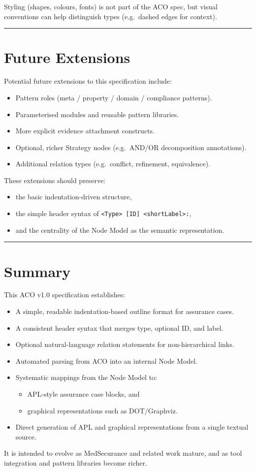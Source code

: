\documentclass[11pt]{article}
\begin{document}
Styling (shapes, colours, fonts) is not part of the ACO spec, but visual conventions can help distinguish types (e.g.\ dashed edges for context).

\bigskip
\hrule
\bigskip

\section{Future Extensions}

Potential future extensions to this specification include:

\begin{itemize}[leftmargin=2em]
  \item Pattern roles (meta / property / domain / compliance patterns).
  \item Parameterised modules and reusable pattern libraries.
  \item More explicit evidence attachment constructs.
  \item Optional, richer Strategy nodes (e.g.\ AND/OR decomposition annotations).
  \item Additional relation types (e.g.\ conflict, refinement, equivalence).
\end{itemize}

These extensions should preserve:
\begin{itemize}[leftmargin=2em]
  \item the basic indentation-driven structure,
  \item the simple header syntax of \texttt{\textless Type\textgreater{} [ID] \textless shortLabel\textgreater:},
  \item and the centrality of the Node Model as the semantic representation.
\end{itemize}

\bigskip
\hrule
\bigskip

\section{Summary}

This ACO v1.0 specification establishes:

\begin{itemize}[leftmargin=2em]
  \item A simple, readable indentation-based outline format for assurance cases.
  \item A consistent header syntax that merges type, optional ID, and label.
  \item Optional natural-language relation statements for non-hierarchical links.
  \item Automated parsing from ACO into an internal Node Model.
  \item Systematic mappings from the Node Model to:
  \begin{itemize}[leftmargin=1.5em]
    \item APL-style assurance case blocks, and
    \item graphical representations such as DOT/Graphviz.
  \end{itemize}
  \item Direct generation of APL and graphical representations from a single textual source.
\end{itemize}

It is intended to evolve as MedSecurance and related work mature, and as tool integration and pattern libraries become richer.
\end{document}
